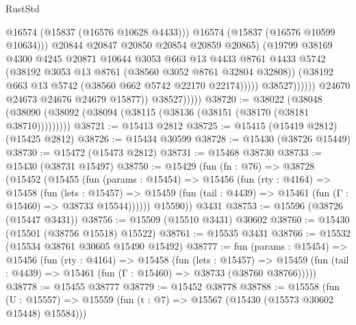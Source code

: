 \begin{lexlean}{RustStd}
\begin{coremodule}
                                        @16574
                                        (@15837 (@16576 @10628 @4433)))
                                      @16574
                                      (@15837 (@16576 @10599 @10634)))
                                    @20844
                                    @20847
                                    @20850
                                    @20854
                                    @20859
                                    @20865)
                                  (@19799
                                    @38169
                                    @4300
                                    @4245
                                    @20871
                                    @10644
                                    @3053
                                    @663
                                    @13
                                    @4433
                                    @8761
                                    @4433
                                    @5742
                                    (@38192 @3053 @13 @8761 (@38560 @3052 @8761 @32804 @32808))
                                    (@38192 @663 @13 @5742 (@38560 @662 @5742 @22170 @22174)))))
                              @38527))))))
                  @24670
                  @24673
                  @24676
                  @24679
                  @15877))
              @38527)))))
@38720 := @38022
    (@38048 (@38090 (@38092 (@38094 (@38115 (@38136 (@38151 (@38170 (@38181 @38710)))))))))
@38721 := @15413 @2812
@38725 := @15415 (@15419 @2812) (@15425 @2812)
@38726 := @15434 @30599
@38728 := @15430 (@38726 @15449)
@38730 := @15472 (@15473 @2812)
@38731 := @15468 @38730
@38733 := @15430 (@38731 @15497)
@38750 := @15429
    (fun (fn : @76) =>
    @38728
      (@15452
        (@15455
          (fun (params : @15454) =>
          @15456
            (fun (rty : @4164) =>
            @15458
              (fun (lets : @15457) =>
              @15459 (fun (tail : @4439) => @15461 (fun (Γ : @15460) => @38733 @15544))))))
        @15590))
    @3431
@38753 := @15596 (@38726 (@15447 @3431))
@38756 := @15509 (@15510 @3431) @30602
@38760 := @15430 (@15501 (@38756 @15518) @15522)
@38761 := @15535 @3431
@38766 := @15532 (@15534 @38761 @30605 @15490 @15492)
@38777 := fun (params : @15454) =>
  @15456
    (fun (rty : @4164) =>
    @15458
      (fun (lets : @15457) =>
      @15459 (fun (tail : @4439) => @15461 (fun (Γ : @15460) => @38733 (@38760 @38766)))))
@38778 := @15455 @38777
@38779 := @15452 @38778
@38788 := @15558
    (fun (U : @15557) => @15559 (fun (t : @7) => @15567 (@15430 (@15573 @30602 @15448) @15584)))

\end{coremodule}
\end{lexlean}
